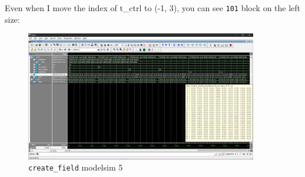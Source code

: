 \documentclass[scale = 0.9]{article}
\newcommand{\code}[1]{\colorbox{light-gray}{\texttt{#1}}} %
\begin{document}
\begin{enumerate}[label=(\alph*)]
        Even when I move the index of t\_ctrl to (-1, 3), you can see \code{101} block on the left size:
        \begin{figure}[H]
          \begin{center}
            \includegraphics[width=0.9\textwidth]{create_field_5.png}
            \caption{\code{create\_field} modelsim 5}\label{create_field_5}
          \end{center}
        \end{figure}

\end{enumerate}
\end{document}
